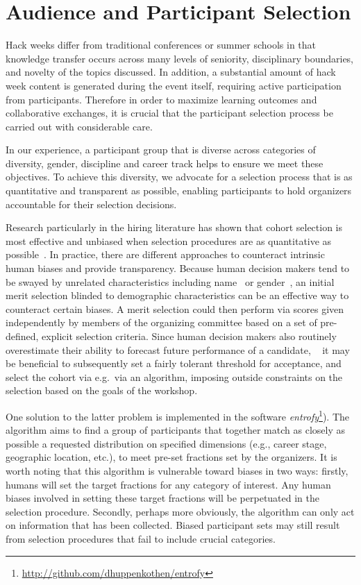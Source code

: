\section*{Audience and Participant Selection}
Hack weeks differ from traditional conferences or summer schools in that knowledge transfer occurs across many levels of seniority, disciplinary boundaries, and novelty of the topics discussed.
In addition, a substantial amount of hack week content is generated during the event itself, requiring active participation from participants.
Therefore in order to maximize learning outcomes and collaborative exchanges, it is crucial that the participant selection process be carried out with considerable care.

In our experience, a participant group that is diverse across categories of diversity, gender, discipline and career track helps to ensure we meet these objectives.
To achieve this diversity, we advocate for a selection process that is as quantitative and transparent as possible, enabling participants to hold organizers accountable for their selection decisions.

Research particularly in the hiring literature has shown that cohort selection is most effective and unbiased when selection procedures are as quantitative as possible~\cite{sunstein2015wiser}. 
In practice, there are different approaches to counteract intrinsic human biases and provide transparency. 
Because human decision makers tend to be swayed by unrelated characteristics including name~\cite{bertrand2004} or gender~\cite{mossracusin2012}, an initial merit selection blinded to demographic characteristics can be an effective way to counteract certain biases. A merit selection could then perform via scores given independently by members of the organizing committee based on a set of pre-defined, explicit selection criteria. 
Since human decision makers also routinely overestimate their ability to forecast future performance of a candidate, ~\cite{highhouse2008} it may be beneficial to subsequently set a fairly tolerant threshold for acceptance, and select the cohort via e.g.\ via an algorithm, imposing outside constraints on the selection based on the goals of the workshop. 

One solution to the latter problem is implemented in the software \textit{entrofy}\footnote{\url{http://github.com/dhuppenkothen/entrofy}}). 
The algorithm aims to find a group of participants that together match as closely as possible a requested distribution on specified dimensions (e.g., career stage, geographic location, etc.), to meet pre-set fractions set by the organizers.
It is worth noting that this algorithm is vulnerable toward biases in two ways: firstly, humans will set the target fractions for any category of interest.  
Any human biases involved in setting these target fractions will be perpetuated in the selection procedure. 
Secondly, perhaps more obviously, the algorithm can only act on information that has been collected.
Biased participant sets may still result from selection procedures that fail to include crucial categories. 

